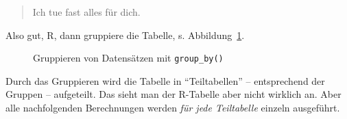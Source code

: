 \documentclass[
  letterpaper,
]{scrbook}
\theoremstyle{definition}
\theoremstyle{definition}
\theoremstyle{definition}
\theoremstyle{remark}
\begin{document}
\begin{quote}
{} Ich tue fast alles für dich. {}
\end{quote}

Also gut, R, dann gruppiere die Tabelle, s. Abbildung~\ref{fig-group}.

\begin{figure}


\caption{\label{fig-group}Gruppieren von Datensätzen mit
\texttt{group\_by()}}

\end{figure}%

Durch das Gruppieren wird die Tabelle in \enquote{Teiltabellen} --
entsprechend der Gruppen -- aufgeteilt. Das sieht man der R-Tabelle aber
nicht wirklich an. Aber alle nachfolgenden Berechnungen werden \emph{für
jede Teiltabelle} einzeln ausgeführt.
\end{document}
